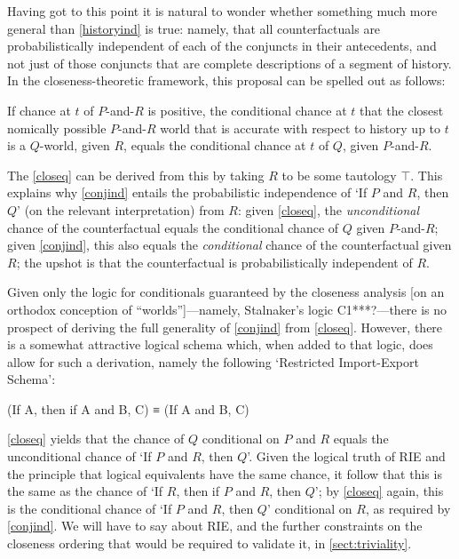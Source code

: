 \documentclass[If.tex]{subfiles}
\begin{document}
Having got to this point it is natural to wonder whether something much more general than \ref{historyind} is true: namely, that all counterfactuals are probabilistically independent of each of the conjuncts in their antecedents, and not just of those conjuncts that are complete descriptions of a segment of history.  In the closeness-theoretic framework, this proposal can be spelled out as follows:
\begin{prop}
	 \label{conjind}
	If chance at $t$ of $P$-and-$R$ is positive, the conditional chance at $t$ that the closest nomically possible $P$-and-$R$ world that is accurate with respect to history up to $t$ is a $Q$-world, given $R$, equals the conditional chance at $t$ of $Q$, given $P$-and-$R$.	
\end{prop}
The \ref{closeq} can be derived from this by taking $R$ to be some tautology $\top$.  This explains why \ref{conjind} entails the probabilistic independence of ‘If $P$ and $R$, then $Q$’ (on the relevant interpretation) from $R$: given \ref{closeq}, the \emph{unconditional} chance of the counterfactual equals the conditional chance of $Q$ given $P$-and-$R$; given \ref{conjind}, this also equals the \emph{conditional} chance of the counterfactual given $R$; the upshot is that the counterfactual is probabilistically independent of $R$.  

Given only the logic for conditionals guaranteed by the closeness analysis [on an orthodox conception of “worlds”]---namely, Stalnaker's logic C1***?---there is no prospect of deriving the full generality of \ref{conjind} from \ref{closeq}.  However, there is a somewhat attractive logical schema which, when added to that logic, does allow for such a derivation, namely the following ‘Restricted Import-Export Schema’:
\begin{prop}
	\sitem[RIE]
	(If A, then if A and B, C) ≡ (If A and B, C) 
\end{prop}
\ref{closeq} yields that the chance of $Q$ conditional on $P$ and $R$ equals the unconditional chance of ‘If $P$ and $R$, then $Q$’.  Given the logical truth of RIE and the principle that logical equivalents have the same chance, it follow that this is the same as the chance of ‘If $R$, then if $P$ and $R$, then $Q$’; by \ref{closeq} again, this is the conditional chance of ‘If $P$ and $R$, then $Q$’ conditional on $R$, as required by \ref{conjind}.  We will have to say about RIE, and the further constraints on the closeness ordering that would be required to validate it, in \autoref{sect:triviality}.
\end{document}
